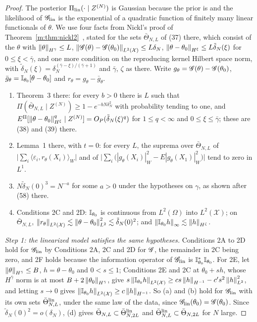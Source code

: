 \begin{proof}
The posterior $\Pi_{\rm lin}(\cdot\mid Z^{(N)})$ is Gaussian because the prior is and the likelihood of $\mathscr{G}_{\rm lin}$ is the exponential of a quadratic function of finitely many linear functionals of $\theta$. We use four facts from Nickl's proof of Theorem~\ref{m:thm:nickl2}~\cite{nicklbvm2024}, stated for the sets $\bar\Theta_{N,L}$ of (37) there, which consist of the $\theta$ with $\left\|\theta\right\|_{H^{\bar\gamma}}\le L$, $\left\|\mathscr{G}(\theta)-\mathscr{G}(\theta_0)\right\|_{L^2(\mathcal X)}\le L\delta_N$, $\left\|\theta-\theta_0\right\|_{H^\xi}\le L\tilde\delta_N(\xi)$ for $0\le\xi<\bar\gamma$, and one more condition on the reproducing kernel Hilbert space norm, with $\tilde\delta_N(\xi)=\delta_N^{(\bar\gamma-\xi)/(\bar\gamma+1)}$ and $\bar\gamma$, $\zeta$ as there. Write $g_\theta=\mathscr{G}(\theta)-\mathscr{G}(\theta_0)$, $\bar g_\theta=\mathbb{I}_{\theta_0}[\theta-\theta_0]$ and $r_\theta=g_\theta-\bar g_\theta$.
\begin{enumerate}[label=(\alph*),nosep]
\item Theorem~3 there: for every $b>0$ there is $L$ such that $\Pi(\bar\Theta_{N,L}\mid Z^{(N)})\ge1-e^{-bN\delta_N^2}$ with probability tending to one, and $E^\Pi[\left\|\theta-\theta_0\right\|^q_{H^\xi}\mid Z^{(N)}]=O_P(\tilde\delta_N(\xi)^q)$ for $1\le q<\infty$ and $0\le\xi\le\bar\gamma$; these are (38) and (39) there.
\item Lemma~1 there, with $t=0$: for every $L$, the suprema over $\bar\Theta_{N,L}$ of $\big|\sum_i\langle\varepsilon_i,r_\theta(X_i)\rangle_W\big|$ and of $\big|\sum_i\big(|g_\theta(X_i)|^2_W-E|g_\theta(X_1)|^2_W\big)\big|$ tend to zero in $L^1$.
\item $N\tilde\delta_N(0)^3=N^{-a}$ for some $a>0$ under the hypotheses on $\gamma$, as shown after (58) there.
\item Conditions 2C and 2D: $\mathbb{I}_{\theta_0}$ is continuous from $L^2(\Omega)$ into $L^2(\mathcal X)$; on $\bar\Theta_{N,L}$, $\left\|r_\theta\right\|_{L^2(\mathcal X)}\lesssim\left\|\theta-\theta_0\right\|^2_{L^2}\lesssim\tilde\delta_N(0)^2$; and $\left\|\mathbb{I}_{\theta_0}h\right\|_\infty\lesssim\left\|h\right\|_{H^\zeta}$.
\end{enumerate}

\emph{Step 1: the linearized model satisfies the same hypotheses.} Conditions 2A to 2D hold for $\mathscr{G}_{\rm lin}$ by Conditions 2A, 2C and 2D for $\mathscr{G}$, the remainder in 2C being zero, and 2F holds because the information operator of $\mathscr{G}_{\rm lin}$ is $\mathbb{I}^*_{\theta_0}\mathbb{I}_{\theta_0}$. For 2E, let $\left\|\theta\right\|_{H^{\bar\gamma}}\le B$, $h=\theta-\theta_0$ and $0<s\le1$; Conditions 2E and 2C at $\theta_0+sh$, whose $H^{\bar\gamma}$ norm is at most $B+2\left\|\theta_0\right\|_{H^{\bar\gamma}}$, give $s\left\|\mathbb{I}_{\theta_0}h\right\|_{L^2(\mathcal X)}\ge cs\left\|h\right\|_{H^{-1}}-c's^2\left\|h\right\|^2_{L^2}$, and letting $s\to0$ gives $\left\|\mathbb{I}_{\theta_0}h\right\|_{L^2(\mathcal X)}\ge c\left\|h\right\|_{H^{-1}}$. So (a) and (b) hold for $\mathscr{G}_{\rm lin}$ with its own sets $\bar\Theta^{\rm lin}_{N,L}$, under the same law of the data, since $\mathscr{G}_{\rm lin}(\theta_0)=\mathscr{G}(\theta_0)$. Since $\tilde\delta_N(0)^2=o(\delta_N)$, (d) gives $\bar\Theta_{N,L}\subset\bar\Theta^{\rm lin}_{N,2L}$ and $\bar\Theta^{\rm lin}_{N,L}\subset\bar\Theta_{N,2L}$ for $N$ large.


\end{proof}
